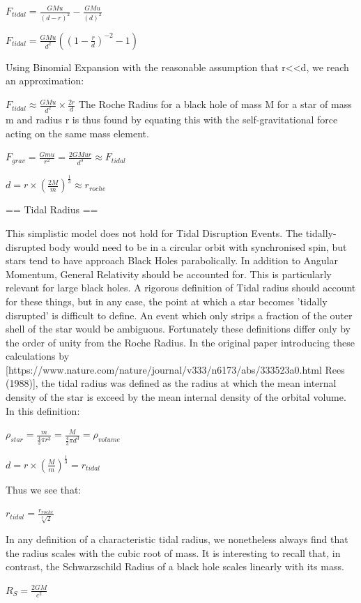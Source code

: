 \documentclass[]{article}
\begin{document}
$F_{tidal} = \frac{GMu}{(d-r)^{2}} - \frac{GMu}{(d)^{2}}$

$F_{tidal} = \frac{GMu}{d^{2}}((1-\frac{r}{d})^{-2} - 1 )$

Using Binomial Expansion with the reasonable assumption that r<<d, we reach an approximation:

$F_{tidal} \approx \frac{GMu}{d^{2}}\times \frac{2r}{d}$
The Roche Radius for a black hole of mass M for a star of mass m and radius r is thus found by equating this with the self-gravitational force acting on the same mass element. 

$F_{grav} = \frac{Gmu}{r^{2}} = \frac{2GMur}{d^{3}} \approx F_{tidal}$

$ d = r \times (\frac{2M}{m})^{\frac{1}{3}} \approx r_{roche}$

== Tidal Radius ==

This simplistic model does not hold for Tidal Disruption Events. The tidally-disrupted body would need to be in a circular orbit with synchronised spin, but stars tend to have approach Black Holes parabolically. In addition to Angular Momentum, General Relativity should be accounted for. This is particularly relevant for large black holes. A rigorous definition of Tidal radius should account for these things, but in any case, the point at which a star becomes 'tidally disrupted' is difficult to define. An event which only strips a fraction of the outer shell of the star would be ambiguous. Fortunately these definitions differ only by the order of unity from the Roche Radius. In the original paper introducing these calculations by [https://www.nature.com/nature/journal/v333/n6173/abs/333523a0.html Rees (1988)], the tidal radius was defined as the radius at which the mean internal density of the star is exceed by the mean internal density of the orbital volume. In this definition:

$\rho_{star} = \frac{m}{\frac{4}{3} \pi r ^{3}}  = \frac{M}{\frac{4}{3} \pi d ^{3}}= \rho_{volume}$

$ d = r \times (\frac{M}{m})^{\frac{1}{3}} = r_{tidal} $

Thus we see that:

$ r_{tidal} = \frac{r_{roche}}{\sqrt[3]{2}} $

In any definition of a characteristic tidal radius, we nonetheless always find that the radius scales with the cubic root of mass. It is interesting to recall that, in contrast, the Schwarzschild Radius of a black hole scales linearly with its mass. 

$R_{S} = \frac{2GM}{c^{2}}$
\end{document}
